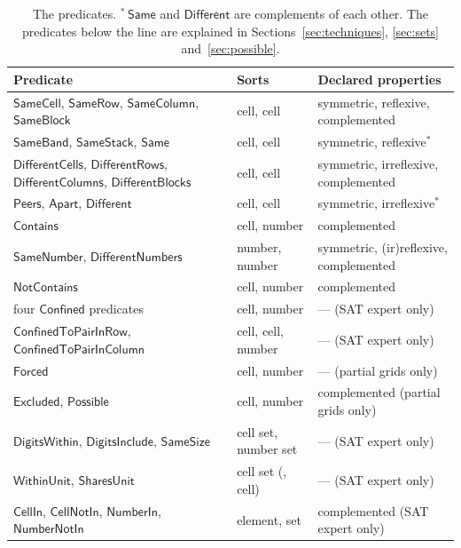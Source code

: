 \documentclass[11pt,a4paper]{article}
\theoremstyle{definition}
\theoremstyle{remark}
\newcommand{\pred}[1]{\mathsf{#1}}
\newcommand{\NotContains}{\pred{NotContains}}
\newcommand{\Forced}{\pred{Forced}}
\newcommand{\Excluded}{\pred{Excluded}}
\begin{document}
\begin{table}[t]
\centering\small
\begin{tabularx}{\textwidth}{@{}>{\raggedright\arraybackslash}Xll@{}}
\toprule
Predicate & Sorts & Declared properties \\
\midrule
$\pred{SameCell}$, $\pred{SameRow}$, $\pred{SameColumn}$, $\pred{SameBlock}$ & cell, cell & symmetric, reflexive, complemented \\
$\pred{SameBand}$, $\pred{SameStack}$, $\pred{Same}$ & cell, cell & symmetric, reflexive$^{\ast}$ \\
$\pred{DifferentCells}$, $\pred{DifferentRows}$, $\pred{DifferentColumns}$, $\pred{DifferentBlocks}$ & cell, cell & symmetric, irreflexive, complemented \\
$\pred{Peers}$, $\pred{Apart}$, $\pred{Different}$ & cell, cell & symmetric, irreflexive$^{\ast}$ \\
$\pred{Contains}$ & cell, number & complemented \\
$\pred{SameNumber}$, $\pred{DifferentNumbers}$ & number, number & symmetric, (ir)reflexive, complemented \\
\midrule
$\NotContains$ & cell, number & complemented \\
four $\pred{Confined}$ predicates & cell, number & --- (SAT expert only) \\
$\pred{ConfinedToPairInRow}$, $\pred{ConfinedToPairInColumn}$ & cell, cell, number & --- (SAT expert only) \\
$\Forced$ & cell, number & --- (partial grids only) \\
$\Excluded$, $\pred{Possible}$ & cell, number & complemented (partial grids only) \\
$\pred{DigitsWithin}$, $\pred{DigitsInclude}$, $\pred{SameSize}$ & cell set, number set & --- (SAT expert only) \\
$\pred{WithinUnit}$, $\pred{SharesUnit}$ & cell set (, cell) & --- (SAT expert only) \\
$\pred{CellIn}$, $\pred{CellNotIn}$, $\pred{NumberIn}$, $\pred{NumberNotIn}$ & element, set & complemented (SAT expert only) \\
\bottomrule
\end{tabularx}
\caption{The predicates. $^{\ast}$\,$\pred{Same}$ and $\pred{Different}$ are complements of each other. The predicates below the line are explained in Sections~\ref{sec:techniques}, \ref{sec:sets} and~\ref{sec:possible}.}
\label{tab:predicates}
\end{table}
\end{document}
